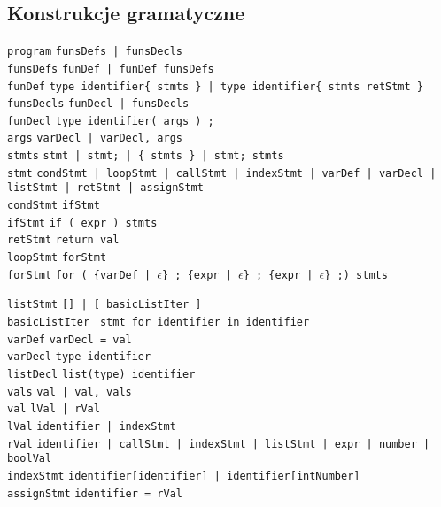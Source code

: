 \documentclass{article}
\newcommand{\keyword}[1]{\colorbox{light-gray}{\texttt{#1}}}
\newcommand{\code}[1]{\texttt{#1}}
\begin{document}
\subsection{Konstrukcje gramatyczne}
\code{program} \textrightarrow \code{funsDefs | funsDecls} \\
\code{funsDefs} \textrightarrow \code{funDef | funDef funsDefs} \\
\code{funDef} \textrightarrow \code{type identifier\{ stmts \} | type identifier\{ stmts retStmt \}} \\
\code{funsDecls} \textrightarrow \code{funDecl | funsDecls} \\
\code{funDecl} \textrightarrow \code{type identifier( args ) \keyword{;}} \\
\code{args} \textrightarrow \code{varDecl | varDecl, args} \\
\code{stmts} \textrightarrow \code{stmt | stmt\keyword{;} | \keyword{\{} stmts \keyword{\}} | stmt\keyword{;} stmts} \\
\code{stmt} \textrightarrow \code{condStmt | loopStmt | callStmt | indexStmt | varDef | varDecl | listStmt | retStmt | assignStmt} \\

\code{condStmt} \textrightarrow \code{ifStmt} \\
\code{ifStmt} \textrightarrow \code{\keyword{if (} expr \keyword{)} stmts } \\
\code{retStmt} \textrightarrow \code{\keyword{return} val} \\

\code{loopStmt} \textrightarrow \code{forStmt} \\
\code{forStmt} \textrightarrow \code{\keyword{for (} \{varDef | $\epsilon$\} \keyword{;} \{expr | $\epsilon$\} \keyword{;} \{expr | $\epsilon$\} \keyword{;)} stmts}

\code{listStmt} \textrightarrow \code{\keyword{[]} | \keyword{[} basicListIter \keyword{]} } \\
\code{basicListIter} \textrightarrow \code{ stmt \keyword{for} identifier \keyword{in} identifier} \\

\code{varDef} \textrightarrow \code{varDecl \keyword{=} val} \\
\code{varDecl} \textrightarrow \code{type identifier} \\
\code{listDecl} \textrightarrow \code{\keyword{list(}type\keyword{)} identifier} \\
\code{vals} \textrightarrow \code{val | val, vals } \\
\code{val} \textrightarrow \code{lVal | rVal} \\
\code{lVal} \textrightarrow \code{identifier | indexStmt} \\
\code{rVal} \textrightarrow \code{identifier | callStmt | indexStmt | listStmt | expr | number | boolVal} \\
\code{indexStmt} \textrightarrow \code{identifier\keyword{[}identifier\keyword{]} | identifier\keyword{[}intNumber\keyword{]}} \\
\code{assignStmt} \textrightarrow \code{identifier \keyword{=} rVal} \\
\end{document}
